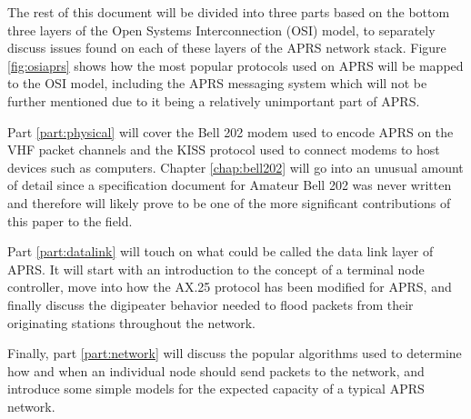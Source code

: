 The rest of this document will be divided into three parts based on the
bottom three layers of the Open Systems Interconnection (OSI) model,
to separately discuss issues found on each of these layers of the APRS network stack.
Figure \ref{fig:osiaprs} shows how the most popular protocols used on APRS
will be mapped to the OSI model, including the APRS messaging system which
will not be further mentioned due to it being a relatively unimportant part of APRS.

Part \ref{part:physical} will cover the Bell 202 modem used to encode APRS on
the VHF packet channels and the KISS protocol used to connect modems to
host devices such as computers. Chapter \ref{chap:bell202} will go into an
unusual amount of detail since a specification document for Amateur Bell 202
was never written and therefore will likely prove to be one of the more significant
contributions of this paper to the field.

Part \ref{part:datalink} will touch on what could be called the data link layer
of APRS. It will start with an introduction to the concept of a terminal
node controller, move into how the AX.25 protocol has been modified for APRS, and
finally discuss the digipeater behavior needed to flood packets from their
originating stations throughout the network.

Finally, part \ref{part:network} will discuss the popular algorithms used to 
determine how and when an individual node should send packets to the network,
and introduce some simple models for the 
expected capacity of a typical APRS network.

